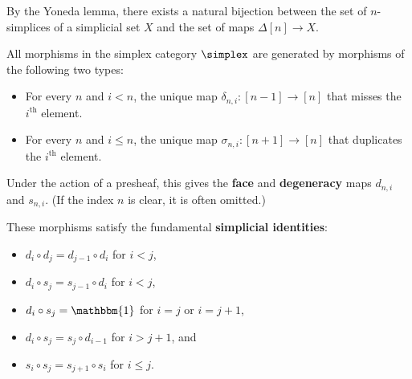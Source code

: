     \begin{property}
        By the Yoneda lemma, there exists a natural bijection between the set of $n$-simplices of a simplicial set $X$ and the set of maps $\Delta[n]\rightarrow X$.
    \end{property}

    \begin{property}
        All morphisms in the simplex category $\simplex$ are generated by morphisms of the following two types:
        \begin{itemize}
            \item For every $n$ and $i<n$, the unique map $\delta_{n,i}:[n-1]\rightarrow[n]$ that misses the $i^{\text{th}}$ element.
            \item For every $n$ and $i\leq n$, the unique map $\sigma_{n,i}:[n+1]\rightarrow[n]$ that duplicates the $i^{\text{th}}$ element.
        \end{itemize}
        Under the action of a presheaf, this gives the \textbf{face} and \textbf{degeneracy} maps $d_{n,i}$ and $s_{n,i}$. (If the index $n$ is clear, it is often omitted.)

        These morphisms satisfy the fundamental \textbf{simplicial identities}:
        \begin{itemize}
            \item $d_i\circ d_j = d_{j-1}\circ d_i$ for $i<j$,
            \item $d_i\circ s_j = s_{j-1}\circ d_i$ for $i<j$,
            \item $d_i\circ s_j = \mathbbm{1}$ for $i=j$ or $i=j+1$,
            \item $d_i\circ s_j = s_j\circ d_{i-1}$ for $i>j+1$, and
            \item $s_i\circ s_j = s_{j+1}\circ s_i$ for $i\leq j$.
        \end{itemize}
    \end{property}


